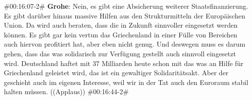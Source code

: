 \begin{description}
	\begin{linenumbers}
		\item \#00:16:07-2\# \textbf{Grohe}: Nein, es gibt eine Absicherung weiterer Staatsfinanzierung. Es gibt darüber hinaus massive Hilfen aus den Strukturmitteln der Europäischen Union. Da wird auch beraten, dass die in Zukunft sinnvoller eingesetzt werden können. Es gibt gar kein vertun das Griechenland in einer Fülle von Bereichen auch hiervon profitiert hat, aber eben nicht genug. Und deswegen muss es darum gehen, dass das was solidarisch zur Verfügung gestellt auch sinnvoll eingesetzt wird. Deutschland haftet mit 37 Milliarden heute schon mit das was an Hilfe für Griechenland geleistet wird, das ist ein gewaltiger Solidaritätsakt. Aber der geschieht auch im eigenen Interesse, weil wir in der Tat auch den Euroraum stabil halten müssen. ((Applaus)) \#00:16:44-2\#
	\end{linenumbers}
\end{description}